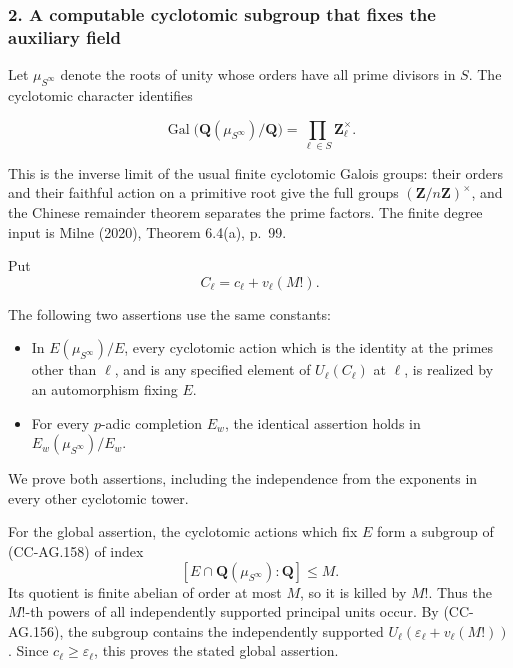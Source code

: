 \subsubsection{2. A computable cyclotomic subgroup that fixes the
auxiliary
field}\label{a-computable-cyclotomic-subgroup-that-fixes-the-auxiliary-field}

Let \(\mu_{S^\infty}\) denote the roots of unity whose orders have all
prime divisors in \(S\). The cyclotomic character identifies

\[
 \operatorname{Gal}\bigl(\mathbf Q(\mu_{S^\infty})/\mathbf Q\bigr)
       =\prod_{\ell\in S}\mathbf Z_\ell^\times.
 \tag{CC-AG.158}
\]

This is the inverse limit of the usual finite cyclotomic Galois groups:
their orders and their faithful action on a primitive root give the full
groups \((\mathbf Z/n\mathbf Z)^\times\), and the Chinese remainder
theorem separates the prime factors. The finite degree input is Milne
(2020), Theorem 6.4(a), p.~99.

Put \[
                    C_\ell=c_\ell+v_\ell(M!).
 \tag{CC-AG.159}
\]

The following two assertions use the same constants:

\begin{itemize}
\tightlist
\item
  In \(E(\mu_{S^\infty})/E\), every cyclotomic action which is the
  identity at the primes other than \(\ell\), and is any specified
  element of \(U_\ell(C_\ell)\) at \(\ell\), is realized by an
  automorphism fixing \(E\).
\item
  For every \(p\)-adic completion \(E_w\), the identical assertion holds
  in \(E_w(\mu_{S^\infty})/E_w\).
\end{itemize}

We prove both assertions, including the independence from the exponents
in every other cyclotomic tower.

For the global assertion, the cyclotomic actions which fix \(E\) form a
subgroup of (CC-AG.158) of index \[
 [E\cap\mathbf Q(\mu_{S^\infty}):\mathbf Q]\le M.
\] Its quotient is finite abelian of order at most \(M\), so it is
killed by \(M!\). Thus the \(M!\)-th powers of all independently
supported principal units occur. By (CC-AG.156), the subgroup contains
the independently supported \(U_\ell(\varepsilon_\ell+v_\ell(M!))\).
Since \(c_\ell\ge\varepsilon_\ell\), this proves the stated global
assertion.

